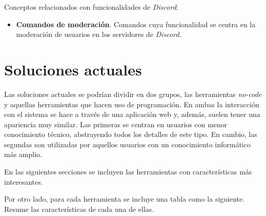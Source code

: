 Conceptos relacionados con funcionalidades de \textit{Discord}:

\begin{itemize}
    \item \textbf{Comandos de moderación}. Comandos cuya funcionalidad se centra en la moderación de usuarios en los servidores de \textit{Discord}.
\end{itemize}

\section{Soluciones actuales}

Las soluciones actuales se podrían dividir en dos grupos, las herramientas \textit{no-code} y aquellas herramientas que hacen uso de programación. En ambas la interacción con el sistema se hace a través de una aplicación web y, además, suelen tener una apariencia muy similar. Las primeras se centran en usuarios con menor conocimiento técnico, abstrayendo todos los detalles de este tipo. En cambio, las segundas son utilizadas por aquellos usuarios con un conocimiento informático más amplio.

En las siguientes secciones se incluyen las herramientas con características más interesantes.

Por otro lado, para cada herramienta se incluye una tabla como la siguiente. Resume las características de cada una de ellas.

